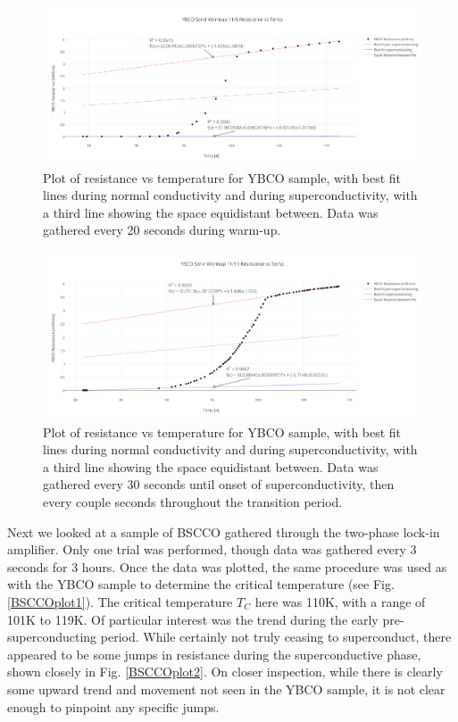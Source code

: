 \documentclass[prb,preprint]{revtex4-1}
\begin{document}
\begin{figure}[width=5in][h!]
\centering
\includegraphics{ybco_sand_warmup_116_resistance_vs_temp.png}
\caption{Plot of resistance vs temperature for YBCO sample, with best fit lines during normal conductivity and during superconductivity, with a third line showing the space equidistant between. Data was gathered every 20 seconds during warm-up.}
\label{YBCOplot1}
\end{figure}

\begin{figure}[width=5in][h!]
\centering
\includegraphics{ybco_sand_warmup_1111_resistance_vs_temp.png}
\caption{Plot of resistance vs temperature for YBCO sample, with best fit lines during normal conductivity and during superconductivity, with a third line showing the space equidistant between. Data was gathered every 30 seconds until onset of superconductivity, then every couple seconds throughout the transition period.}
\label{YBCOplot2}
\end{figure}

Next we looked at a sample of BSCCO gathered through the two-phase lock-in amplifier. Only one trial was performed, though data was gathered every 3 seconds for 3 hours. Once the data was plotted, the same procedure was used as with the YBCO sample to determine the critical temperature (see Fig. \ref{BSCCOplot1}). The critical temperature $T_C$ here was 110K, with a range of 101K to 119K. Of particular interest was the trend during the early pre-superconducting period. While certainly not truly ceasing to superconduct, there appeared to be some jumps in resistance during the superconductive phase, shown closely in Fig. \ref{BSCCOplot2}. On closer inspection, while there is clearly some upward trend and movement not seen in the YBCO sample, it is not clear enough to pinpoint any specific jumps.
\end{document}
